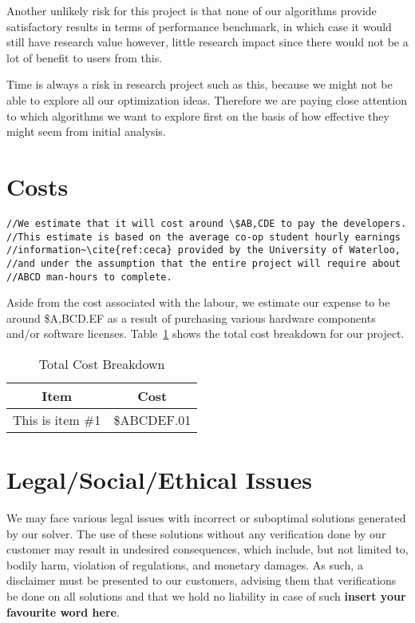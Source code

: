 \documentclass[11pt]{article}
\begin{document}
Another unlikely risk for this project is that none of our algorithms
provide satisfactory results in terms of performance benchmark, in
which case it would still have research value however, little research
impact since there would not be a lot of benefit to users from this.

Time is always a risk in research project such as this, because we
might not be able to explore all our optimization ideas. Therefore we
are paying close attention to which algorithms we want to explore first
on the basis of how effective they might seem from initial analysis.

\section{Costs}
\begin{verbatim}
//We estimate that it will cost around \$AB,CDE to pay the developers.
//This estimate is based on the average co-op student hourly earnings
//information~\cite{ref:ceca} provided by the University of Waterloo,
//and under the assumption that the entire project will require about 
//ABCD man-hours to complete.
\end{verbatim}

Aside from the cost associated with the labour, we estimate our expense
to be around \$A,BCD.EF as a result of purchasing various hardware
components and/or software licenses. Table~\ref{tbl:costbreakdown} shows the
total cost breakdown for our project.

\begin{table}
  \captionsetup{margin=30pt}
  \caption{Total Cost Breakdown}
  \label{tbl:costbreakdown}
  \centering
  \begin{tabular}{|r|l|}
    \hline
    \multicolumn{1}{|c|}{\textbf{Item}} &
    \multicolumn{1}{|c|}{\textbf{Cost}} \\
    \hline
      This is item \#1 & \$ABCDEF.01 \\
    \hline
  \end{tabular}
\end{table}


\section{Legal/Social/Ethical Issues}
We may face various legal issues with incorrect or suboptimal solutions
generated by our solver. The use of these solutions without any
verification done by our customer may result in undesired
consequences, which include, but not limited to, bodily harm, violation
of regulations, and monetary damages. As such, a disclaimer must be
presented to our customers, advising them that verifications be done
on all solutions and that we hold no liability in case of such
\textbf{\lbrack insert your favourite word here\rbrack}.
\end{document}
